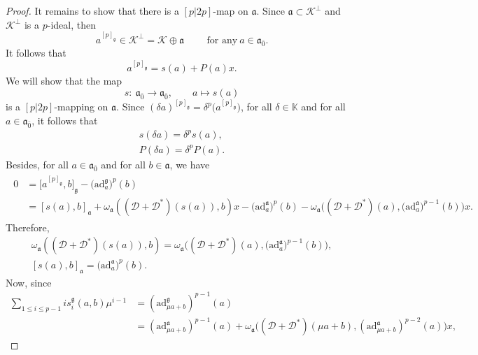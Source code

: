 \documentclass[10pt,a4paper]{amsart}
\numberwithin{equation}{section}
\begin{document}
\begin{proof}
It remains to show that there is a $[p|2p]$-map on $\mathfrak{a}$. Since $\mathfrak{a} \subset \mathscr{K}^\perp$ and ${\mathscr K}^\perp$ is a $p$-ideal, then
\[
a^{[p]_\mathfrak{g}}\in \mathscr{K}^\perp=\mathscr{K} \oplus \mathfrak{a} \qquad \text{ for any} \ a \in \mathfrak{a}_{\bar 0}.
\]
It follows that
\begin{equation*}
a^{[p]_\mathfrak{g}}=s(a)+P(a)x.
\end{equation*}
We will show that the map
\[
s\colon \ \mathfrak{a}_{\bar 0} \rightarrow \mathfrak{a}_{\bar 0}, \qquad a\mapsto s(a)
\]
is a $[p|2p]$-mapping on $\mathfrak{a}$.
Since $(\delta a)^{[p]_\mathfrak{g}}=\delta ^p\bigl(a^{[p]_\mathfrak{g}}\bigr)$, for all $\delta \in \mathbb K$ and for all $a\in \mathfrak{a}_{\bar 0} $, it follows that
\begin{gather}
s(\delta a) = \delta^p s(a),\label{rescond1rec}\\
P(\delta a) = \delta^p P(a).\label{Pcond1rec}
\end{gather}
Besides, for all $a\in \mathfrak{a}_{\bar 0}$ and for all $b\in \mathfrak{a}$, we have
\begin{align*}
\begin{split}
0&=\big[a^{[p]_\mathfrak{g}},b\big]_\mathfrak{g}-\bigl(\mathrm{ad}_a^\mathfrak{g}\bigr)^{p}(b)\\
&=[s(a),b]_\mathfrak{a}+\omega_\mathfrak{a}(({\mathscr D} + {\mathscr D}^*)(s(a)), b) x -\bigl(\mathrm{ad}_a^\mathfrak{a}\bigr)^p(b)- \omega_\mathfrak{a}\bigl(({\mathscr D} + {\mathscr D}^*)(a),\bigl(\mathrm{ad}_a^\mathfrak{a}\bigr)^{p-1}(b)\bigr) x.
\end{split}
\end{align*}
Therefore,
\begin{gather}
\omega_\mathfrak{a}(({\mathscr D}+{\mathscr D}^*)(s(a)), b) = \omega_\mathfrak{a}\bigl(({\mathscr D}+{\mathscr D}^*)(a),
\bigl(\mathrm{ad}_a^\mathfrak{a}\bigr)^{p-1}(b)\bigr) ,\label{cocycondrec}\\
[s(a),b]_\mathfrak{a} = \bigl(\mathrm{ad}_a^\mathfrak{a}\bigr)^p(b). \label{rescondrec}
\end{gather}
Now, since
\begin{align*}
 \sum_{1\leq i \leq p-1} is_i^\mathfrak{g}(a,b) \mu^{i-1}&=(\mathrm{ad}_{\mu a+b}^\mathfrak{g})^{p-1}(a)\\
&=(\mathrm{ad}_{\mu a+b}^\mathfrak{a})^{p-1}(a)+\omega_\mathfrak{a}\bigl(({\mathscr D}+{\mathscr D}^*)(\mu a+b),(\mathrm{ad}_{\mu a+b}^\mathfrak{a})^{p-2}(a) \bigr)x,
\end{align*}

\end{proof}
\end{document}
